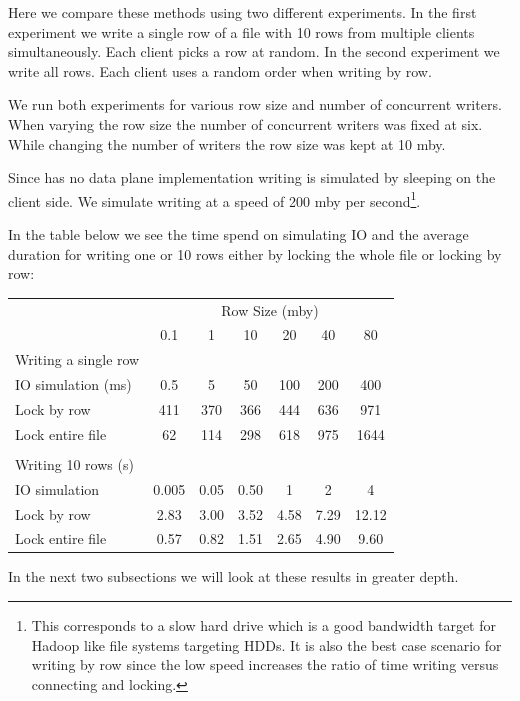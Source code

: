 Here we compare these methods using two different experiments. In the first experiment we write a single row of a file with 10 rows from multiple clients simultaneously. Each client picks a row at random. In the second experiment we write all rows. Each client uses a random order when writing by row.

We run both experiments for various row size and number of concurrent writers. When varying the row size the number of concurrent writers was fixed at six. While changing the number of writers the row size was kept at 10 \ac{mby}.

Since \name{} has no data plane implementation writing is simulated by sleeping on the client side. We simulate writing at a speed of 200 \ac{mby} per second\footnote{This corresponds to a slow hard drive which is a good bandwidth target for Hadoop like file systems targeting HDDs. It is also the best case scenario for writing by row since the low speed increases the ratio of time writing versus connecting and locking.}.

In the table below we see the time spend on simulating IO and the average duration for writing one or 10 rows either by locking the whole file or locking by row:
%
\begin{tabular}{lcccccc} \toprule
	& \multicolumn{6}{c}{Row Size (\ac{mby})} \\ \cmidrule(r){2-7}
	                   & 0.1 & 1 & 10 & 20 & 40 & 80 \\ \midrule
	Writing a single row  \\ \cmidrule(r){1-1}
	IO simulation (ms) & 0.5          & 5          & 50          & 100         & 200         & 400 \\
	Lock by row & 411 & 370 & 366 & 444 & 636 & 971\\
	Lock entire file & 62 & 114 & 298 & 618 & 975 & 1644 \\
\smallskip \\
	Writing 10 rows (s)\\ \cmidrule(r){1-1}
	IO simulation & 0.005          & 0.05          & 0.50          & 1         & 2         & 4 \\
	Lock by row & 2.83         & 3.00       & 3.52        & 4.58        & 7.29        & 12.12 \\
	Lock entire file & 0.57         & 0.82       & 1.51        & 2.65        & 4.90        & 9.60 \\ \bottomrule
\end{tabular}
%
In the next two subsections we will look at these results in greater depth.
%
